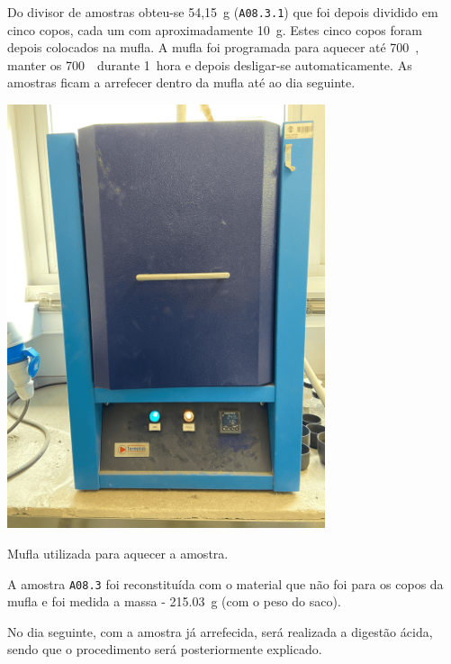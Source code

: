 Do divisor de amostras obteu-se 54,15~g (\texttt{A08.3.1}) que foi depois dividido em cinco copos, cada um com aproximadamente 10~g.
Estes cinco copos foram depois colocados na mufla.
A mufla foi programada para aquecer até 700~\graus, manter os 700~\graus \, durante 1~hora e depois desligar-se automaticamente.
As amostras ficam a arrefecer dentro da mufla até ao dia seguinte.
\begin{marginfigure}
    \centering
    \includegraphics[width=0.7\textwidth]{figures/Mufla}
    \caption{Mufla utilizada para aquecer a amostra.}
    \label{fig:mufla}
\end{marginfigure}

A amostra \texttt{A08.3} foi reconstituída com o material que não foi para os copos da mufla e foi medida a massa - 215.03~g (com o peso do saco).

No dia seguinte, com a amostra já arrefecida, será realizada a digestão ácida, sendo que o procedimento será posteriormente explicado.


